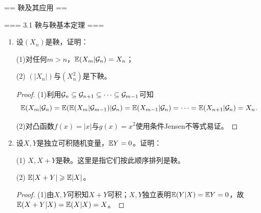 == 鞅及其应用 ==

=== 3.1 鞅与鞅基本定理 ===
\begin{enumerate}
    \item[3.1.1] 设$(X_n)$是鞅，证明：

    (1)对任何$m>n$，$\mathbb{E}(X_m|\mathcal{G}_n)=X_n$；

    (2) $(|X_n|)$与$(X_n^2)$是下鞅。
    \begin{proof}
        (1)利用$\mathcal{G}_n\subseteq\mathcal{G}_{n+1}\subseteq\cdots\subseteq\mathcal{G}_{m-1}$可知
        \[\mathbb{E}(X_m|\mathcal{G}_n)=\mathbb{E}(\mathbb{E}(X_m|\mathcal{G}_{m-1})|\mathcal{G}_n)=\mathbb{E}(X_{m-1}|\mathcal{G}_n)=\cdots=\mathbb{E}(X_{n+1}|\mathcal{G}_n)=X_n.\]

        (2)对凸函数$f(x)=|x|$与$g(x)=x^2$使用条件Jensen不等式易证。
    \end{proof}
    \item[3.1.2] 设$X,Y$是独立可积随机变量，$\mathbb{E} Y=0$。证明：

    (1) $X,X+Y$是鞅。这里是指它们按此顺序排列是鞅。

    (2) $\mathbb{E}|X+Y|\geqslant\mathbb{E}|X|$。
    \begin{proof}
        (1)由$X,Y$可积知$X+Y$可积；$X,Y$独立表明$\mathbb{E}(Y|X)=\mathbb{E} Y=0$，故$\mathbb{E}(X+Y|X)=\mathbb{E}(X|X)=X$。


\end{proof}
\end{enumerate}
